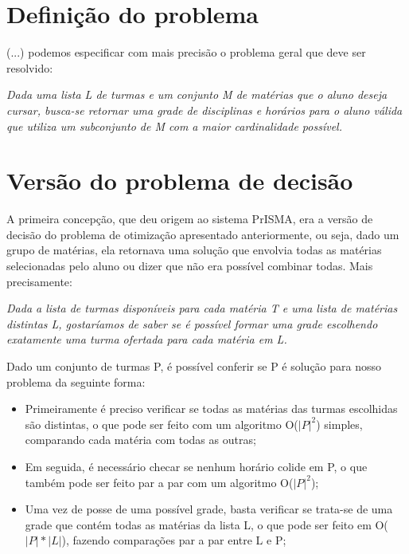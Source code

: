 \documentclass[graduacao,brazil]{ThesisPUC}
\begin{document}
\section{Definição do problema}

(...) podemos especificar com mais precisão o problema geral que deve ser resolvido:

\vspace{3 mm}
\textit{Dada uma lista L de turmas e um conjunto M de matérias que o aluno deseja cursar, busca-se retornar uma grade de disciplinas e horários para o aluno válida que utiliza um subconjunto de M com a maior cardinalidade possível.}
\vspace{3 mm}

\section{Versão do problema de decisão}

A primeira concepção, que deu origem ao sistema PrISMA, era a versão de decisão do problema de otimização apresentado anteriormente, ou seja, dado um grupo de matérias, ela retornava uma solução que envolvia todas as matérias selecionadas pelo aluno ou dizer que não era possível combinar todas. Mais precisamente:

\vspace{3 mm}
\textit{Dada a lista de turmas disponíveis para cada matéria T e uma lista de matérias distintas L, gostaríamos de saber se é possível formar uma grade escolhendo exatamente uma turma ofertada para cada matéria em L.}
\vspace{3 mm}

Dado um conjunto de turmas P, é possível conferir se P é solução para nosso problema da seguinte forma:

\begin{itemize}
	\item Primeiramente é preciso verificar se todas as matérias das turmas escolhidas são distintas, o que pode ser feito com um algoritmo O($|P|^2$) simples, comparando cada matéria com todas as outras;
	\item Em seguida, é necessário checar se nenhum horário colide em P, o que também pode ser feito par a par com um algoritmo O($|P|^2$);
	\item Uma vez de posse de uma possível grade, basta verificar se trata-se de uma grade que contém todas as matérias da lista L, o que pode ser feito em O($|P|*|L|$), fazendo comparações par a par entre L e P;
\end{itemize}
\end{document}
